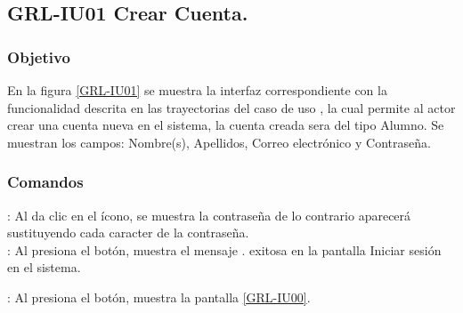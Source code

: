 \clearpage
\subsection{GRL-IU01 Crear Cuenta.}

\subsubsection{Objetivo}
En la figura \ref{GRL-IU01} se muestra la interfaz correspondiente con la funcionalidad descrita en las
trayectorias del caso de uso  , la cual permite al actor crear una cuenta
nueva en el sistema, la cuenta creada sera del tipo Alumno.
Se muestran los campos: Nombre(s), Apellidos, Correo electrónico y
Contraseña.

\subsubsection{Comandos}

\Titem \IUPass : Al da clic en el ícono, se muestra la contraseña de lo contrario aparecerá \IUOculto \thinspace sustituyendo cada caracter de la contraseña. \\

\Titem {} : Al presiona el botón, muestra el mensaje . exitosa en la
pantalla Iniciar sesión en el sistema.

\Titem {} : Al presiona el botón, muestra la pantalla \ref{GRL-IU00}.



\clearpage
